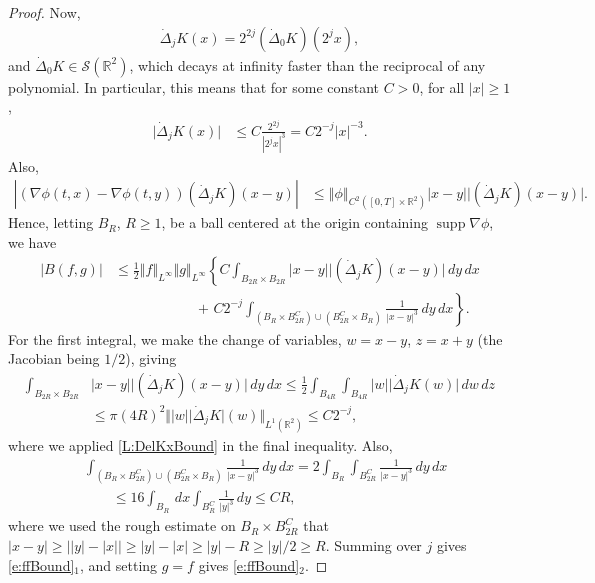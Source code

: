 \documentclass[11pt,reqno,xcolor=svgnames]{amsart}
\def\R{{\mathbb R}}
\theoremstyle{plain}
\theoremstyle{definition}
\theoremstyle{plain}
\theoremstyle{remark}
\newcommand{\abs}[1]{\left\vert#1\right\vert}
\newcommand{\smallabs}[1]{\ensuremath{\vert #1 \vert}}
\DeclareMathOperator{\supp}{supp}
\newcommand{\iny}{\ensuremath{\infty}}
\newcommand{\grad}{\ensuremath{\nabla}}
\newcommand{\norm}[1]{\ensuremath{\left\Vert #1 \right\Vert}}
\newcommand{\smallnorm}[1]{\ensuremath{\Vert #1 \Vert}}
\newcommand{\Cal}[1]{\ensuremath{\mathcal{#1}}}
\newcommand{\Del}{\dot{\Delta}}
\begin{document}
\begin{proof}
    Now,
	\begin{align*}
		\Del_j K(x) = 2^{2j} (\Del_0 K)(2^j x),
	\end{align*}
	and $\Del_0 K \in \Cal{S}(\R^2)$, which decays at infinity
	faster than the reciprocal of any polynomial. In particular,
	this means that for some constant $C > 0$, for all $\abs{x} \ge 1$,
	\begin{align*}
		\smallabs{\Del_j K(x)}
			&\le C \frac{2^{2j}}{\abs{2^j x}^3}
			= C 2^{-j} \abs{x}^{-3}.
	\end{align*}
	Also, 
	\begin{align*}
		\abs{(\grad \phi(t, x) - \grad \phi(t, y)) (\Del_j K)(x - y)}
			&\le \norm{\phi}_{C^2([0, T] \times \R^2)}
				\abs{x - y} \smallabs{(\Del_j K)(x - y)}.
	\end{align*}
    Hence, letting $B_R$, $R \ge 1$,  be a ball centered at the
	origin containing
	$\supp \grad \phi$, we have
	\begin{align*}
		\abs{B(f, g)}
			&\le \frac{1}{2} \norm{f}_{L^\iny} \norm{g}_{L^\iny}
			\left\{C \int_{B_{2R} \times B_{2R}} \abs{x - y}
				\smallabs{(\Del_j K)(x - y)}
				\, dy \, dx
				\right. \\
			&\qquad\qquad\qquad
				\left.
				+ \, \, C 2^{-j}
					\int_{(B_R \times B_{2R}^C)
						\cup (B_{2R}^C \times B_R)}
					\frac{1}{\abs{x - y}^3} \,dy \, dx
			\right\}.
	\end{align*}
	For the first integral, we make the
	change of variables, $w = x - y$, $z = x + y$
	(the Jacobian being $1/2$), giving
	\begin{align*}
		\int_{B_{2R} \times B_{2R}} &\abs{x - y}
				\smallabs{(\Del_j K)(x - y)}
				\, dy \, dx
			\le \frac{1}{2} \int_{B_{4R}}
				\int_{B_{4R}}
				\abs{w} \smallabs{\Del_j K(w)} \, dw \, dz \\
			&\le \pi (4R)^2
				\smallnorm{\abs{w} \smallabs{\Del_j K}(w)}_{L^1(\R^2)}
			\le C 2^{-j},
	\end{align*}
    where we applied \cref{L:DelKxBound} in the final inequality.
	Also,
	\begin{align*}
		&\int_{(B_R \times B_{2R}^C) \cup (B_{2R}^C \times B_R)}
			\frac{1}{\abs{x - y}^3} \,dy \, dx
			= 2
				\int_{B_R} \int_{B_{2R}^C}
					\frac{1}{\abs{x - y}^3} \,dy \, dx \\
			&\qquad
			\le 16 \int_{B_R} \, dx \int_{B_R^C}
					\frac{1}{\abs{y}^3} \,dy
			\le C R,
	\end{align*}
	where we used the rough estimate on $B_R \times B_{2R}^C$
	that $\abs{x - y} \ge \abs{\abs{y} - \abs{x}} \ge
	\abs{y} - \abs{x} \ge \abs{y} - R \ge \abs{y}/2 \ge R$.
    Summing over $j$ gives \cref{e:ffBound}$_1$, and setting $g = f$ gives \cref{e:ffBound}$_2$.
\end{proof}
\end{document}
